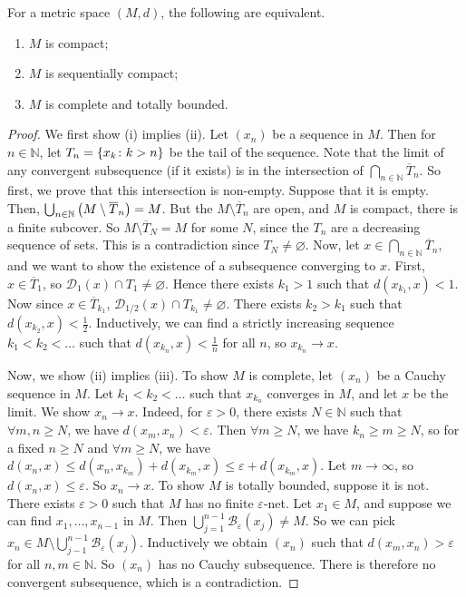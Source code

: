 \begin{theorem}
	For a metric space \( (M, d) \), the following are equivalent.
	\begin{enumerate}
		\item \( M \) is compact;
		\item \( M \) is sequentially compact;
		\item \( M \) is complete and totally bounded.
	\end{enumerate}
\end{theorem}
\begin{proof}
	We first show (i) implies (ii).
	Let \( (x_n) \) be a sequence in \( M \).
	Then for \( n \in \mathbb N \), let \( T_n = \qty{x_k \colon k > n} \) be the tail of the sequence.
	Note that the limit of any convergent subsequence (if it exists) is in the intersection of \( \bigcap_{n \in \mathbb N} \overline T_n \).
	So first, we prove that this intersection is non-empty.
	Suppose that it is empty.
	Then, \( \bigcup_{n \in \mathbb N} \qty(M \setminus \overline T_n) = M \).
	But the \( M \setminus \overline T_n \) are open, and \( M \) is compact, there is a finite subcover.
	So \( M \setminus \overline T_N = M \) for some \( N \), since the \( T_n \) are a decreasing sequence of sets.
	This is a contradiction since \( T_N \neq \varnothing \).
	Now, let \( x \in \bigcap_{n \in \mathbb N} \overline T_n \), and we want to show the existence of a subsequence converging to \( x \).
	First, \( x \in \overline T_1 \), so \( \mathcal D_1(x) \cap T_1 \neq \varnothing \).
	Hence there exists \( k_1 > 1 \) such that \( d(x_{k_1}, x) < 1 \).
	Now since \( x \in \overline T_{k_1} \), \( \mathcal D_{1/2}(x) \cap T_{k_1} \neq \varnothing \).
	There exists \( k_2 > k_1 \) such that \( d(x_{k_2}, x) < \frac{1}{2} \).
	Inductively, we can find a strictly increasing sequence \( k_1 < k_2 < \dots \) such that \( d(x_{k_n}, x) < \frac{1}{n} \) for all \( n \), so \( x_{k_n} \to x \).

	Now, we show (ii) implies (iii).
	To show \( M \) is complete, let \( (x_n) \) be a Cauchy sequence in \( M \).
	Let \( k_1 < k_2 < \dots \) such that \( x_{k_n} \) converges in \( M \), and let \( x \) be the limit.
	We show \( x_n \to x \).
	Indeed, for \( \varepsilon > 0 \), there exists \( N \in \mathbb N \) such that \( \forall m, n \geq N \), we have \( d(x_m, x_n) < \varepsilon \).
	Then \( \forall m \geq N \), we have \( k_n \geq m \geq N \), so for a fixed \( n \geq N \) and \( \forall m \geq N \), we have \( d(x_n, x) \leq d(x_n, x_{k_m}) + d(x_{k_m}, x) \leq \varepsilon + d(x_{k_m}, x) \).
	Let \( m \to \infty \), so \( d(x_n, x) \leq \varepsilon \).
	So \( x_n \to x \).
	To show \( M \) is totally bounded, suppose it is not.
	There exists \( \varepsilon > 0 \) such that \( M \) has no finite \( \varepsilon \)-net.
	Let \( x_1 \in M \), and suppose we can find \( x_1, \dots, x_{n-1} \) in \( M \).
	Then \( \bigcup_{j=1}^{n-1} \mathcal B_\varepsilon(x_j) \neq M \).
	So we can pick \( x_n \in M \setminus \bigcup_{j-1}^{n-1} \mathcal B_\varepsilon(x_j) \).
	Inductively we obtain \( (x_n) \) such that \( d(x_m, x_n) > \varepsilon \) for all \( n, m \in \mathbb N \).
	So \( (x_n) \) has no Cauchy subsequence.
	There is therefore no convergent subsequence, which is a contradiction.


\end{proof}
